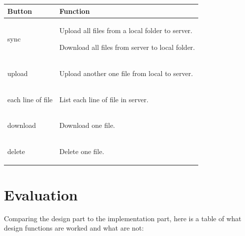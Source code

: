 \documentclass[a4paper]{article}
\begin{document}
\begin{flushleft}
\begin{minipage}{\linewidth}
\centering
{} \label{table:conflict}
\begin{tabular}[H]{|C{2 cm}|C{9.5 cm}|}\toprule[1.5pt]
\bf Button & \bf Function \\\midrule
sync 	&  \begin{flushleft}\item{Upload all files from a local folder to server.}\item{Download all files from server to local folder.}\end{flushleft}\\\hline
upload   &  \begin{flushleft}Upload another one file from local to server.\end{flushleft}\\\hline
each line of file   &  \begin{flushleft}List each line of file in server.\end{flushleft}\\\hline
download   &  \begin{flushleft}Download one file.\end{flushleft}\\\hline
delete  	&  \begin{flushleft}Delete one file.\end{flushleft}\\

\bottomrule[1.25pt]
\end {tabular}\par
\bigskip
\end{minipage}



\section{Evaluation}
Comparing the design part to the implementation part, here is a table of what design functions are worked and what are not:\newline




\end{flushleft}
\end{document}
